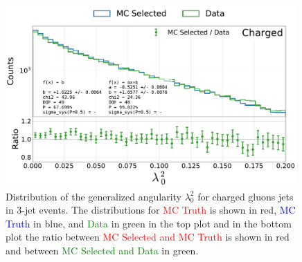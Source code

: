 \begin{figure}[h!]
  \centerfloat
  \includegraphics[width=0.99\textwidth, trim=0 0 0 0, clip, page=6]{figures/quarks/generalized_angularities_cha-down_sample=1.00-ML_vars=vertex-selection=b-ejet_min=4-n_iter_RS_lgb=99-n_iter_RS_xgb=9-cdot_cut=0.90-version=19.pdf}
  \caption[Generalized Angularities for Neutral Gluons Jets: $\lambda_0^2$]
          {Distribution of the generalized angularity $\lambda_0^2$ for charged gluons jets in 3-jet events. The distributions for \textcolor{red}{MC Truth} is shown in red, \textcolor{blue}{MC Truth} in blue, and \textcolor{green}{Data} in green in the top plot and in the bottom plot the ratio between \textcolor{red}{MC Selected and MC Truth} is shown in red and between \textcolor{green}{MC Selected and Data} in green. }
  \label{fig:q:generalized_angularities_neu_lambda_0_2}
\end{figure}
